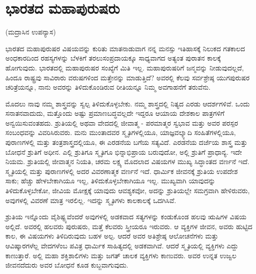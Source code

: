
\chapter{ಭಾರತದ ಮಹಾಪುರುಷರು}

\begin{center}
(ಮದ್ರಾಸಿನ ಉಪನ್ಯಾಸ)
\end{center}

ಭಾರತದ ಮಹಾಪುರುಷರ ವಿಷಯವನ್ನು ಕುರಿತು ಮಾತನಾಡುವಾಗ ನನ್ನ ಮನಸ್ಸು ಇತಿಹಾಸಕ್ಕೆ ನಿಲುಕದ ಗತಕಾಲದ ಅಂಧಕಾರದಿಂದ ರಹಸ್ಯಗಳನ್ನು ಬೆಳಕಿಗೆ ತರಲು\break ಸಂಪ್ರದಾಯಕ್ಕೂ ಸಾಧ್ಯವಾಗದ ಅತ್ಯಂತ ಪುರಾತನ ಕಾಲಕ್ಕೆ ಹೋಗುವುದು. ಭಾರತದಲ್ಲಿ ಮಹಾಪುರುಷರ ಸಂಖ್ಯೆಗೆ ಮಿತಿ ಇಲ್ಲ. ಮಹಾಪುರುಷರಿಗೆ ಜನ್ಮವನ್ನು ನೀಡುವುದಲ್ಲದೆ, ಹಿಂದೂ ರಾಷ್ಟ್ರವು ಸಾವಿರಾರು ವರುಷಗಳಿಂದ ಮತ್ತೇನನ್ನು ಮಾಡುತ್ತಿದೆ? ಅವರಲ್ಲಿ ಕೆಲವು ಸರ್ವಶ್ರೇಷ್ಠ ಯುಗಪುರುಷರ ಚರಿತ್ರೆಯನ್ನೂ, ನಾನು ಅವರನ್ನು ತಿಳಿದುಕೊಂಡಿರುವ ರೀತಿಯನ್ನೂ ನಿಮ್ಮ ಅವಗಾಹನೆಗೆ ತರುವೆನು.

ಮೊದಲು ನಾವು ನಮ್ಮ ಶಾಸ್ತ್ರವನ್ನು ಸ್ವಲ್ಪ ತಿಳಿದುಕೊಳ್ಳಬೇಕು. ನಮ್ಮ ಶಾಸ್ತ್ರದಲ್ಲಿ ನಿತ್ಯದ ಎರಡು ಆದರ್ಶಗಳಿವೆ. ಒಂದು ಸನಾತನವಾದುದು, ಮತ್ತೊಂದು ಅಷ್ಟು ಪ್ರಮಾಣಬದ್ಧವಲ್ಲದೇ ಇದ್ದರೂ ಆಯಾಯ ದೇಶಕಾಲ ಪಾತ್ರಗಳಿಗೆ ಅನ್ವಯಿಸುವಂತಹದು. ಶ್ರುತಿಯಲ್ಲಿ ಅಥವಾ ವೇದದಲ್ಲಿ ಜೀವಾತ್ಮ - ಪರಮಾತ್ಮರ ಸ್ವಭಾವ ಮತ್ತು ಅವರ ಪರಸ್ಪರ ಸಂಬಂಧವನ್ನು ವಿವರಿಸಿರುವರು. ಮನು ಮುಂತಾದವರ ಸ್ಮೃತಿಗಳಲ್ಲಿಯೂ, ಯಾಜ್ಞವಲ್ಕ್ಯಾದಿ ಸಂಹಿತೆಗಳಲ್ಲಿಯೂ, ಪುರಾಣಗಳಲ್ಲಿ ಮತ್ತು ತಂತ್ರಶಾಸ್ತ್ರದಲ್ಲಿಯೂ, ಈ ಎರಡನೆಯ ಬಗೆಯ ಸತ್ಯವಿದೆ. ಎರಡನೆಯ ದರ್ಜೆಯ ಶಾಸ್ತ್ರ ಮತ್ತು ಬೋಧನೆ ಶ್ರುತಿಗೆ ಅಧೀನ. ಎಲ್ಲಿ ಶ್ರುತಿಗೂ ಸ್ಮೃತಿಗೂ ಭಿನ್ನಾಭಿಪ್ರಾಯ ಬರುವುದೋ, ಅಲ್ಲಿ ಶ್ರುತಿಗೆ ಪ್ರಾಧಾನ್ಯ. ಇದೇ ನಿಯಮ. ಶ್ರುತಿಯಲ್ಲಿ ಜೀವಾತ್ಮನ ನಿಯತಿ, ಚರಮ ಲಕ್ಷ್ಯ ಮೊದಲಾದ ವಿಷಯಗಳ ಮುಖ್ಯ ಸಿದ್ಧಾಂತದ ವರ್ಣನೆ ಇದೆ. ಸ್ಮೃತಿಯಲ್ಲಿ ಮತ್ತು ಪುರಾಣಗಳಲ್ಲಿ ಅದರ ವಿವರಣಾ\-ತ್ಮಕ ವರ್ಣನೆ ಇದೆ. ಧಾರ್ಮಿಕ ಜೀವನಕ್ಕೆ ಶ್ರುತಿಯ ಉಪದೇಶ ಸಾಕು; ಹೆಚ್ಚು ಹೇಳಬೇಕಾಗಿಯೂ ಇಲ್ಲ, ತಿಳಿದುಕೊಳ್ಳಬೇಕಾಗಿಯೂ ಇಲ್ಲ. ಮುಖ್ಯವಾಗಿ ಯಾವುದನ್ನು ತಿಳಿದುಕೊಳ್ಳಬೇಕೋ, ಜೀವಿಯ ಮೋಕ್ಷಕ್ಕೆ ಯಾವುದು ಆವಶ್ಯಕವೋ, ಅದನ್ನು ಶ್ರುತಿಯಲ್ಲೇ ಸಮಗ್ರವಾಗಿ ಹೇಳಿರುವರು, ಅವುಗಳಲ್ಲಿ ವಿವರಣೆ ಮಾತ್ರ ಇರಲಿಲ್ಲ. ಇದನ್ನು ಸ್ಮೃತಿಗಳು ಕಾಲಕಾಲಕ್ಕೆ ಒದಗಿಸಿವೆ.

ಶ್ರುತಿಯ ಇನ್ನೊಂದು ವೈಶಿಷ್ಟ್ಯವೆಂದರೆ ಅವುಗಳಲ್ಲಿ ಅಡಕವಾದ ಸತ್ಯಗಳನ್ನು ಕಂಡುಕೊಂಡ ಹಲವು ಋಷಿಗಳ ವಿಷಯ ಅಲ್ಲಿದೆ. ಅವರಲ್ಲಿ ಹಲವರು ಪುರುಷರು, ಮತ್ತೆ ಕೆಲವರು ಸ್ತ್ರೀಯರೂ ಇರುವರು. ಆ ವ್ಯಕ್ತಿಗಳ ಜೀವನ, ಅವರು ಹುಟ್ಟಿದ ಕಾಲ, ಈ ವಿಷಯಗಳು ತಿಳಿದಿರುವುದು ಬಹಳ ಅಲ್ಪ. ಆದರೆ ಅವರ ಅತಿಶ್ರೇಷ್ಠ ಆಲೋಚನೆಗಳು ಮತ್ತು ಆವಿಷ್ಕಾರಗಳೆಲ್ಲ ವೇದಗಳೆಂಬ ಪವಿತ್ರ ಧಾರ್ಮಿಕ ಸಾಹಿತ್ಯದಲ್ಲಿ ಅಡಕವಾಗಿವೆ. ಆದರೆ ಸ್ಮೃತಿಯಲ್ಲಿ ವ್ಯಕ್ತಿಗಳು ಎದ್ದು ಕಾಣುತ್ತಾರೆ. ಅಲ್ಲಿ ಮಹಾ ಶಕ್ತಿಶಾಲಿಗಳು ಮತ್ತು ಜಗತ್​ ಚಾಲಕ ವ್ಯಕ್ತಿಗಳು ಕಾಣುವರು. ಅವರ ಉನ್ನತ ಉಜ್ವಲ ಜೀವನದೆದುರು ಅವರ ಬೋಧನೆ ಕೂಡ ಕುಬ್ಜವಾಗುವುದು.

